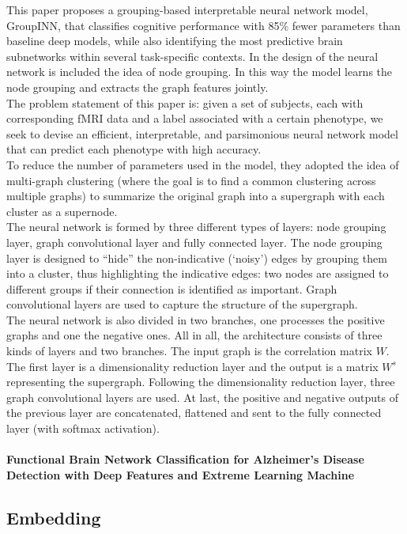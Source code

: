 This paper proposes a grouping-based interpretable neural network model, GroupINN, that classifies cognitive performance with 85\% fewer parameters than baseline deep models, while also identifying the most predictive brain subnetworks within several task-specific contexts. In the design of the neural network is included the idea of node grouping. In this way the model learns the node grouping and extracts the graph features jointly.
\\
The problem statement of this paper is: given a set of subjects, each with corresponding fMRI data and a label associated with a certain phenotype, we seek to devise an efficient, interpretable, and parsimonious neural network model that can predict each phenotype with high accuracy.
\\
To reduce the number of parameters used in the model, they adopted the idea of multi-graph clustering (where the goal is to find a common clustering across multiple graphs) to summarize the original graph into a supergraph with each cluster as a supernode. 
\\
The neural network is formed by three different types of layers: node grouping layer, graph convolutional layer and fully connected layer. The node grouping layer is designed to “hide” the non-indicative (‘noisy’) edges by grouping them into a cluster, thus highlighting the indicative edges: two nodes are assigned to different groups if their connection is identified as important.
Graph convolutional layers are used to capture the structure of the supergraph.
\\
The neural network is also divided in two branches, one processes the positive graphs and one the negative ones. 
All in all, the architecture consists of three kinds of layers and two branches. 
The input graph is the correlation matrix $W$. The first layer is a dimensionality reduction layer and the output is a matrix $W^{s}$ representing the supergraph. Following the dimensionality reduction layer, three graph convolutional layers are used. At last, the positive and negative outputs of the previous layer are concatenated, flattened and sent to the fully connected layer (with softmax activation).
\paragraph{Functional Brain Network Classification for Alzheimer’s Disease
Detection with Deep Features and Extreme Learning Machine
}
\subsection{Embedding}
